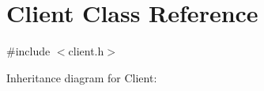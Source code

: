 \hypertarget{classClient}{}\section{Client Class Reference}
\label{classClient}


{\ttfamily \#include $<$client.\+h$>$}



Inheritance diagram for Client\+:
